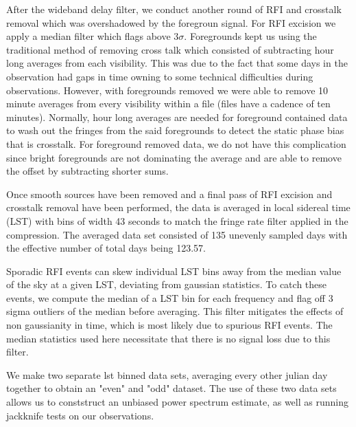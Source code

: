 \documentclass[twocolumn,numberedappendix]{emulateapj} \shorttitle{PSA64}
\begin{document}
After the wideband delay filter, we conduct another round of RFI and crosstalk
removal which was overshadowed by the foregroun signal. For RFI excision we
apply a median filter which flags above $3\sigma$. Foregrounds kept us using the
traditional method of removing cross talk which consisted of subtracting hour
long averages from each visibility. This was due to the fact that some days in
the observation had gaps in time owning to some technical difficulties during
observations. However, with foregrounds removed we were able to remove 10 minute
averages from every visibility within a file (files have a cadence of ten
minutes). Normally, hour long averages are needed for foreground contained data
to wash out the fringes from the said foregrounds to detect the static phase
bias that is crosstalk. For foreground removed data, we do not have this
complication since bright foregrounds are not dominating the average and are
able to remove the offset by subtracting shorter sums.

Once smooth sources have been removed and a final pass of RFI excision and
crosstalk removal have been performed, the data is averaged in local sidereal
time (LST) with bins of width 43 seconds to match the fringe rate filter applied
in the compression. The averaged data set consisted of 135 unevenly sampled
days with the effective number of total days being 123.57. 

Sporadic RFI events can skew individual LST bins away from the median value of
the sky at a given LST, deviating from gaussian statistics. To catch these
events, we compute the median of a LST bin for each frequency and flag off 3
sigma outliers of the median before averaging. This filter mitigates
the effects of non gaussianity in time, which is most likely due to spurious
RFI events. The median statistics used here necessitate that there is no signal
loss due to this filter.

We make two separate lst binned data sets, averaging every other julian day
together to obtain an "even" and "odd" dataset. The use of these two data sets
allows us to conststruct an unbiased power spectrum estimate, as well as running
jackknife tests on our observations. 
\end{document}
